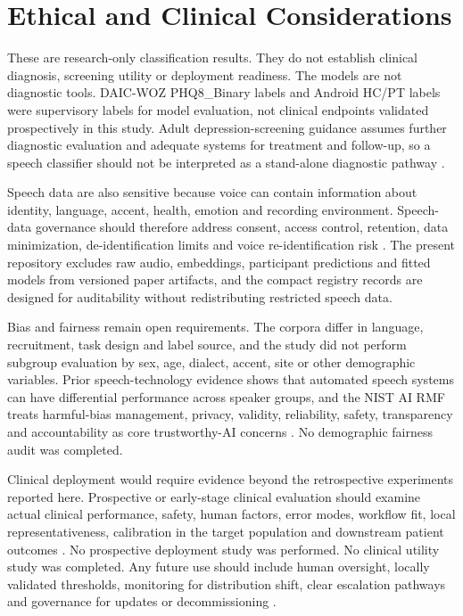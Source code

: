 \documentclass[lettersize,journal]{IEEEtran}
\begin{document}
\section{Ethical and Clinical Considerations}

These are research-only classification results. They do not establish clinical diagnosis, screening utility or deployment readiness. The models are not diagnostic tools. DAIC-WOZ PHQ8\_Binary labels and Android HC/PT labels were supervisory labels for model evaluation, not clinical endpoints validated prospectively in this study. Adult depression-screening guidance assumes further diagnostic evaluation and adequate systems for treatment and follow-up, so a speech classifier should not be interpreted as a stand-alone diagnostic pathway \cite{uspstf2023depressionScreening}.

Speech data are also sensitive because voice can contain information about identity, language, accent, health, emotion and recording environment. Speech-data governance should therefore address consent, access control, retention, data minimization, de-identification limits and voice re-identification risk \cite{nautsch2019gdprSpeech,tomashenko2021voicePrivacy}. The present repository excludes raw audio, embeddings, participant predictions and fitted models from versioned paper artifacts, and the compact registry records are designed for auditability without redistributing restricted speech data.

Bias and fairness remain open requirements. The corpora differ in language, recruitment, task design and label source, and the study did not perform subgroup evaluation by sex, age, dialect, accent, site or other demographic variables. Prior speech-technology evidence shows that automated speech systems can have differential performance across speaker groups, and the NIST AI RMF treats harmful-bias management, privacy, validity, reliability, safety, transparency and accountability as core trustworthy-AI concerns \cite{koenecke2020racialDisparitiesASR,nist2023aiRmf}. No demographic fairness audit was completed.

Clinical deployment would require evidence beyond the retrospective experiments reported here. Prospective or early-stage clinical evaluation should examine actual clinical performance, safety, human factors, error modes, workflow fit, local representativeness, calibration in the target population and downstream patient outcomes \cite{kelly2019clinicalImpactAI,vasey2022decideAI,liu2020consortAI,vanCalster2019calibration}. No prospective deployment study was performed. No clinical utility study was completed. Any future use should include human oversight, locally validated thresholds, monitoring for distribution shift, clear escalation pathways and governance for updates or decommissioning \cite{who2021aiHealthEthics,nist2023aiRmf}.
\end{document}
